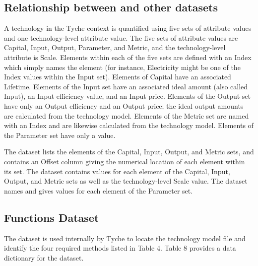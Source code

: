 \documentclass[letterpaper,10pt,english]{sphinxmanual}
\begin{document}
\subsection{Relationship between  and other datasets}
\label{\detokenize{cheat-sheet:relationship-between-indices-and-other-datasets}}
A technology in the Tyche context is quantified using five sets of attribute values and one technology-level attribute value. The five sets of attribute values are Capital, Input, Output, Parameter, and Metric, and the technology-level attribute is Scale. Elements within each of the five sets are defined with an Index which simply names the element (for instance, Electricity might be one of the Index values within the Input set). Elements of Capital have an associated Lifetime. Elements of the Input set have an associated ideal amount (also called Input), an Input efficiency value, and an Input price. Elements of the Output set have only an Output efficiency and an Output price; the ideal output amounts are calculated from the technology model. Elements of the Metric set are named with an Index and are likewise calculated from the technology model. Elements of the Parameter set have only a value.

The  dataset lists the elements of the Capital, Input, Output, and Metric sets, and contains an Offset column giving the numerical location of each element within its set. The  dataset contains values for each element of the Capital, Input, Output, and Metric sets as well as the technology-level Scale value. The  dataset names and gives values for each element of the Parameter set.


\subsection{Functions Dataset}
\label{\detokenize{cheat-sheet:functions-dataset}}
The  dataset is used internally by Tyche to locate the technology model file and identify the four required methods listed in Table 4. Table 8 provides a data dictionary for the  dataset.
\end{document}
